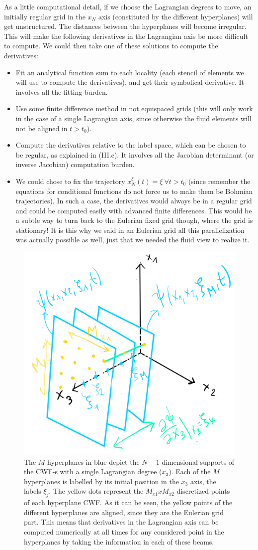 \documentclass[11pt, a4paper]{article} %
\begin{document}
As a little computational detail, if we choose the Lagrangian degrees to move, an initially regular grid in the $x_N$ axis (constituted by the different hyperplanes) will get unstructured. The distances between the hyperplanes will become irregular. This will make the following derivatives in the Lagrangian axis be more difficult to compute. We could then take one of these solutions to compute the derivatives:
\begin{itemize}
\item Fit an analytical function sum to each locality (each stencil of elements we will use to compute the derivatives), and get their symbolical derivative. It involves all the fitting burden.
\item Use some finite difference method in not equispaced grids (this will only work in the case of a single Lagrangian axis, since otherwise the fluid elements will not be aligned in $t>t_0$).
\item Compute the derivatives relative to the label space, which can be chosen to be regular, as explained in (III.e). It involves all the Jacobian determinant (or inverse Jacobian) computation burden.
\item We could chose to fix the trajectory $x_N^\xi(t)=\xi\ \forall t>t_0$ (since remember the equations for conditional functions do not force us to make them be Bohmian trajectories). In such a case, the derivatives would always be in a regular grid and could be computed easily with advanced finite differences. This would be a subtle way to turn back to the Eulerian fixed grid though, where the grid is stationary! It is this why we said in an Eulerian grid all this parallelization was actually possible as well, just that we needed the fluid view to realize it.
\end{itemize} 
\begin{figure}[h!]
  \centering
    \includegraphics[width=0.5\linewidth]{hyperplaness.png}
  \caption{The $M$ hyperplanes in blue depict the $N-1$ dimensional supports of the CWF-s with a single Lagrangian degree ($x_3$). Each of the $M$ hyperplanes is labelled by its initial position in the $x_3$ axis, the labels $\xi_j$. The yellow dots represent the $M_{x1}xM_{x2}$ discretized points of each hyperplane CWF. As it can be seen, the yellow points of the different hyperplanes are aligned, since they are the Eulerian grid part. This means that derivatives in the Lagrangian axis can be computed numerically at all times for any considered point in the hyperplanes by taking the information in each of these beams.}
  \label{fig:hyperplane}
\end{figure}
\end{document}
